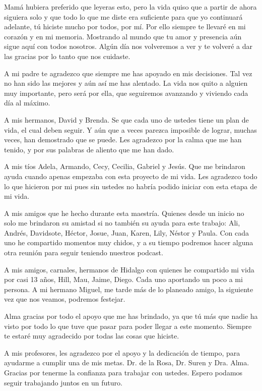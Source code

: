 
Mamá hubiera preferido que leyeras esto, pero la vida quiso que a partir de ahora  siguiera solo y que todo lo que me diste era suficiente para que yo continuará adelante, tú hiciste mucho por todos, por mí. Por ello siempre te llevaré en mi corazón y en mi memoria. Mostrando al mundo que tu amor y presencia aún sigue aquí con todos nosotros. Algún día nos volveremos a ver y te volveré a dar las gracias por lo tanto que nos cuidaste.
\vspace{0.5cm}

A mi padre te agradezco que siempre me has apoyado en mis decisiones. Tal vez no han sido las mejores y aún así me has alentado. La vida nos quito a alguien muy importante, pero será por ella, que seguiremos avanzando y viviendo cada día al máximo.
\vspace{0.5cm}

A mis hermanos, David y Brenda. Se que cada uno de ustedes tiene un plan de vida, el cual deben seguir. Y aún que a veces parezca imposible de lograr, muchas veces, han demostrado que se puede. Les agradezco por la calma que me han tenido, y por sus palabras de aliento que me han dado.
\vspace{0.5cm}

A mis tíos Adela, Armando, Cecy, Cecilia, Gabriel y Jesús. Que me brindaron ayuda cuando apenas empezaba con esta proyecto de mi vida. Les agradezco todo lo que hicieron por mi pues sin ustedes no habría podido iniciar con esta etapa de mi vida.
\vspace{0.5cm}

A mis amigos que he hecho durante esta maestría. Quienes desde un inicio no solo me brindaron su amistad si no también su ayuda para este trabajo: Ali, Andrés, Davidsote, Héctor, Josue, Juan, Karen, Lily, Néstor y Paula. Con cada uno he compartido momentos muy chidos, y a su tiempo podremos hacer alguna otra reunión para seguir teniendo nuestros podcast.
\vspace{0.5cm}

A mis amigos, carnales, hermanos de Hidalgo con quienes he compartido mi vida por casi 13 años, Hill, Mau, Jaime, Diego. Cada uno aportando un poco a mi persona. A mi hermano Miguel, me tarde más de lo planeado amigo, la siguiente vez que nos veamos, podremos festejar.
\vspace{0.5cm}

Alma gracias por todo el apoyo que me has brindado, ya que tú más que nadie ha visto por todo lo que tuve que pasar para poder llegar a este momento. Siempre te estaré muy agradecido por todas las cosas que hiciste.
\vspace{0.5cm}

A mis profesores, les agradezco por el apoyo y la dedicación de tiempo, para ayudarme a cumplir una de mis metas. Dr. de la Rosa, Dr. Suren y Dra. Alma. Gracias por tenerme la confianza para trabajar con ustedes. Espero podamos seguir trabajando juntos en un futuro.

 